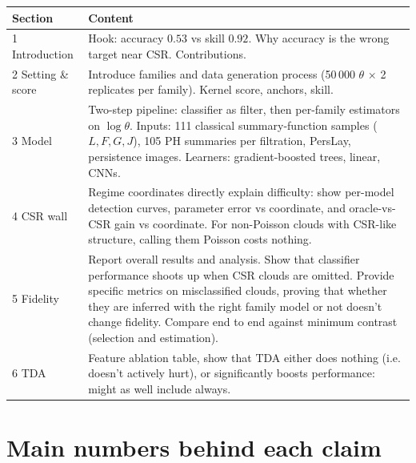 \documentclass[11pt]{article}
\begin{document}
\begin{tabularx}{\linewidth}{@{}p{2.8cm}X@{}}
\toprule
Section & Content \\
\midrule

1 Introduction &
Hook: accuracy $0.53$ vs skill $0.92$. Why accuracy is the wrong target near CSR. Contributions. \\

2 Setting \& score &
Introduce families and data generation process (50\,000 $\theta$ $\times$ 2 replicates per family). Kernel score, anchors, skill.\\

3 Model &
Two-step pipeline: classifier as filter, then per-family estimators on $\log\theta$. Inputs: 111 classical summary-function samples ($L,F,G,J$), 105 PH summaries per filtration, PersLay, persistence images. Learners: gradient-boosted trees, linear, CNNs. \\

4 CSR wall &
Regime coordinates directly explain difficulty: show per-model detection curves, parameter error vs coordinate, and oracle-vs-CSR gain vs coordinate. For non-Poisson clouds with CSR-like structure, calling them Poisson costs nothing. \\

5 Fidelity &
Report overall results and analysis. Show that classifier performance shoots up when CSR clouds are omitted. Provide specific metrics on misclassified clouds, proving that whether they are inferred with the right family model or not doesn't change fidelity. Compare end to end against minimum contrast (selection and estimation). \\

6 TDA &
Feature ablation table, show that TDA either does nothing (i.e. doesn't actively hurt), or significantly boosts performance: might as well include always. \\

\bottomrule
\end{tabularx}

\newpage


\section*{Main numbers behind each claim}
\end{document}
